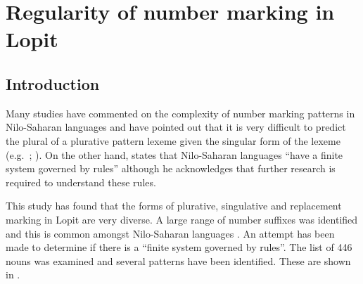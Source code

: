 \documentclass[output=paper]{langsci/langscibook}
\begin{document}
\section{Regularity of number marking in Lopit}\label{sec:moodie:4}


\subsection{Introduction} \label{sec:moodie:4.1}


Many studies have commented on the complexity of number marking patterns in Nilo-Saharan languages and have pointed out that it is very difficult to predict the plural of a plurative pattern lexeme given the singular form of the lexeme (e.g.\ \citealt[4]{TuckerMpaayei1955}; \citealt[3]{HildersLawrance1957}). On the other hand, \citet[255]{Dimmendaal2000} states that Nilo-Saharan languages “have a finite system governed by rules” although he acknowledges that further research is required to understand these rules. 

This study has found that the forms of plurative, singulative and replacement marking in Lopit are very diverse. A large range of number suffixes was identified and this is common amongst Nilo-Saharan languages \citep[219]{Dimmendaal2000}. An attempt has been made to determine if there is a “finite system governed by rules”. The list of 446 nouns was examined and several patterns have been identified. These are shown in . 
\end{document}
